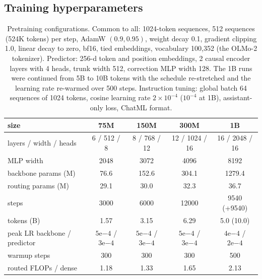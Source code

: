 \subsection{Training hyperparameters}
\label{app:hparams}
\begin{table}[h]\centering\footnotesize\setlength{\tabcolsep}{3pt}
\begin{tabular}{lcccc}\toprule
size & 75M & 150M & 300M & 1B \\\midrule
layers / width / heads & 6 / 512 / 8 & 8 / 768 / 12 & 12 / 1024 / 16 & 16 / 2048 / 16 \\
MLP width & 2048 & 3072 & 4096 & 8192 \\
backbone params (M) & 76.6 & 152.6 & 304.1 & 1279.4 \\
routing params (M) & 29.1 & 30.0 & 32.3 & 36.7 \\
steps & 3000 & 6000 & 12000 & 9540 (+9540) \\
tokens (B) & 1.57 & 3.15 & 6.29 & 5.0 (10.0) \\
peak LR backbone / predictor & $5\mathrm{e}{-4}$ / $3\mathrm{e}{-4}$ & $5\mathrm{e}{-4}$ / $3\mathrm{e}{-4}$ & $5\mathrm{e}{-4}$ / $3\mathrm{e}{-4}$ & $4\mathrm{e}{-4}$ / $2\mathrm{e}{-4}$ \\
warmup steps & 300 & 300 & 300 & 500 \\
routed FLOPs / dense & 1.18 & 1.33 & 1.65 & 2.13 \\
\bottomrule\end{tabular}
\caption{Pretraining configurations. Common to all: 1024-token sequences, 512 sequences (524K tokens) per step, AdamW $(0.9, 0.95)$, weight decay 0.1, gradient clipping 1.0, linear decay to zero, bf16, tied embeddings, vocabulary 100,352 (the OLMo-2 tokenizer). Predictor: 256-d token and position embeddings, 2 causal encoder layers with 4 heads, trunk width 512, correction MLP width 128. The 1B runs were continued from 5B to 10B tokens with the schedule re-stretched and the learning rate re-warmed over 500 steps. Instruction tuning: global batch 64 sequences of 1024 tokens, cosine learning rate $2{\times}10^{-4}$ ($10^{-4}$ at 1B), assistant-only loss, ChatML format.}
\label{tab:hparams}\end{table}

